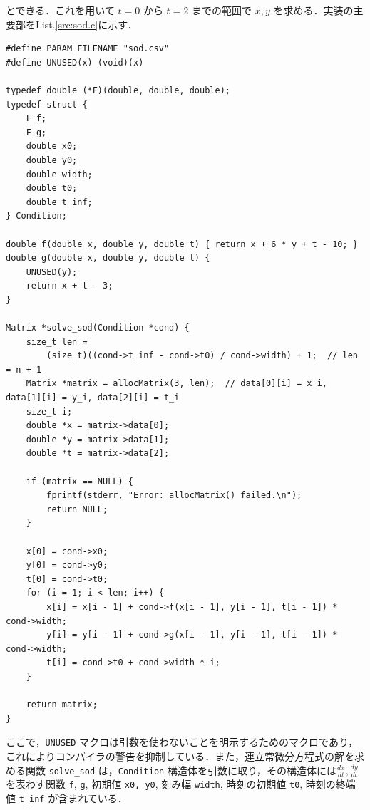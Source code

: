 \documentclass[gutter=20mm,fore-edge=20mm,head_space=30mm,foot_space=30mm]{jlreq}
\begin{document}
とできる．これを用いて $t = 0$ から $t = 2$ までの範囲で $x, y$ を求める．実装の主要部をList.\ref{src:sod.c}に示す．
\begin{lstlisting}[caption=sod.c,label=src:sod.c]
#define PARAM_FILENAME "sod.csv"
#define UNUSED(x) (void)(x)

typedef double (*F)(double, double, double);
typedef struct {
    F f;
    F g;
    double x0;
    double y0;
    double width;
    double t0;
    double t_inf;
} Condition;

double f(double x, double y, double t) { return x + 6 * y + t - 10; }
double g(double x, double y, double t) {
    UNUSED(y);
    return x + t - 3;
}

Matrix *solve_sod(Condition *cond) {
    size_t len =
        (size_t)((cond->t_inf - cond->t0) / cond->width) + 1;  // len = n + 1
    Matrix *matrix = allocMatrix(3, len);  // data[0][i] = x_i, data[1][i] = y_i, data[2][i] = t_i
    size_t i;
    double *x = matrix->data[0];
    double *y = matrix->data[1];
    double *t = matrix->data[2];

    if (matrix == NULL) {
        fprintf(stderr, "Error: allocMatrix() failed.\n");
        return NULL;
    }

    x[0] = cond->x0;
    y[0] = cond->y0;
    t[0] = cond->t0;
    for (i = 1; i < len; i++) {
        x[i] = x[i - 1] + cond->f(x[i - 1], y[i - 1], t[i - 1]) * cond->width;
        y[i] = y[i - 1] + cond->g(x[i - 1], y[i - 1], t[i - 1]) * cond->width;
        t[i] = cond->t0 + cond->width * i;
    }

    return matrix;
}
\end{lstlisting}

ここで，\verb|UNUSED| マクロは引数を使わないことを明示するためのマクロであり，これによりコンパイラの警告を抑制している．また，連立常微分方程式の解を求める関数 \verb|solve_sod| は，\verb|Condition| 構造体を引数に取り，その構造体には$\displaystyle \frac{dx}{dt}, \frac{dy}{dt}$を表わす関数 \verb|f|, \verb|g|, 初期値 \verb|x0, y0|, 刻み幅 \verb|width|, 時刻の初期値 \verb|t0|, 時刻の終端値 \verb|t_inf| が含まれている．
\end{document}
